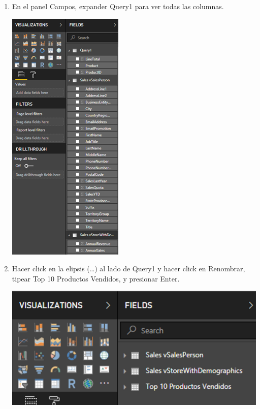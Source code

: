 \begin{itemize}
\begin{enumerate}
\item En el panel Campos, expander Query1 para ver todas las columnas.


\begin{center}
\includegraphics[scale=0.55]{./Imagenes/a15.png}
\end{center}


\item Hacer click en la elipsis (…) al lado de Query1 y hacer click en Renombrar, tipear Top 10 Productos Vendidos, y presionar Enter.


\begin{center}
\includegraphics[scale=0.55]{./Imagenes/a16.png}
\end{center}



\end{enumerate}









\end{itemize}
